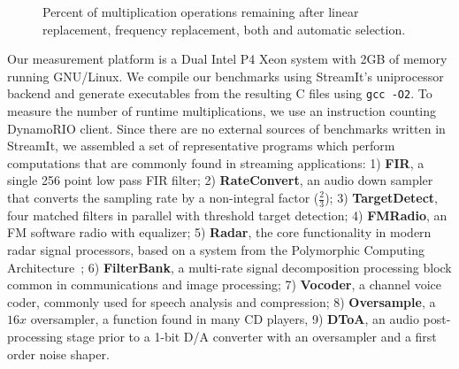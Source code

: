 \begin{figure}[t]
\center
\epsfxsize=3.2in
\vspace{-6pt}
\caption{Percent of multiplication operations remaining after 
  linear replacement, frequency replacement, both and automatic selection.}
\label{fig:linear-freq-both}
\vspace{-12pt}
\end{figure}


Our measurement platform is a Dual Intel P4 Xeon
system with 2GB of memory running GNU/Linux. 
We compile our benchmarks
using StreamIt's uniprocessor backend and generate executables from
the resulting C files using {\tt gcc -O2}.  To measure the number of
runtime multiplications, we use an instruction counting
DynamoRIO\cite{dynamo99} client.  Since there are no external sources
of benchmarks written in StreamIt, we assembled a set of
representative programs which perform computations that are commonly
found in streaming applications: 1) {\bf FIR}, a single 256 point low
pass FIR filter; 2) {\bf RateConvert}, an audio down sampler that
converts the sampling rate by a non-integral factor ($\frac{2}{3}$);
3) {\bf TargetDetect}, four matched filters in parallel with threshold
target detection; 4) {\bf FMRadio}, an FM software radio with
equalizer; 5) {\bf Radar}, the core functionality in modern radar
signal processors, based on a system from the Polymorphic Computing
Architecture~\cite{pca}; 6) {\bf FilterBank}, a multi-rate signal
decomposition processing block common in communications and image
processing; 7) {\bf Vocoder}, a channel voice coder, commonly used for
speech analysis and compression; 8) {\bf Oversample}, a $16x$
oversampler, a function found in many CD players, 9) {\bf DToA}, an
audio post-processing stage prior to a 1-bit D/A converter with
an oversampler and a first order noise shaper.

